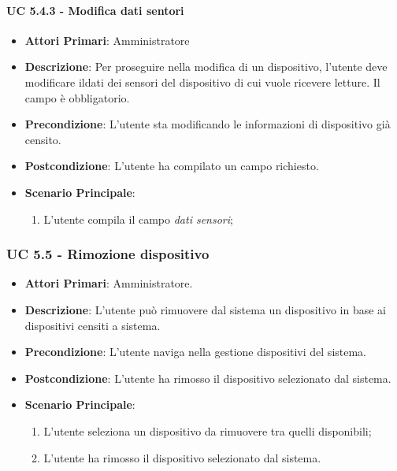 				\paragraph{UC 5.4.3 - Modifica dati sentori}
				\begin{itemize}
					\item \textbf{Attori Primari}: Amministratore
					\item \textbf{Descrizione}: Per proseguire nella modifica di un dispositivo, l'utente deve modificare ildati dei sensori del dispositivo di cui vuole ricevere letture. Il campo è obbligatorio.
					\item \textbf{Precondizione}: L'utente sta modificando le informazioni di dispositivo già censito.
					\item \textbf{Postcondizione}: L'utente ha compilato un campo richiesto.
					\item \textbf{Scenario Principale}:
					\begin{enumerate}
						\item{L'utente compila il campo \textit{dati sensori};}
					\end{enumerate}
				\end{itemize}
			
			\subsubsection{UC 5.5 - Rimozione dispositivo}
			\begin{itemize}
				\item \textbf{Attori Primari}: Amministratore.
				\item \textbf{Descrizione}: L'utente può rimuovere dal sistema un dispositivo in base ai dispositivi censiti a sistema.
				\item \textbf{Precondizione}: L'utente naviga nella gestione dispositivi del sistema.
				\item \textbf{Postcondizione}: L'utente ha rimosso il dispositivo selezionato dal sistema.
				\item \textbf{Scenario Principale}:
				\begin{enumerate}
					\item{L'utente seleziona un dispositivo da rimuovere tra quelli disponibili;}
					\item{L'utente ha rimosso il dispositivo selezionato dal sistema.}
				\end{enumerate}
			\end{itemize}
			
